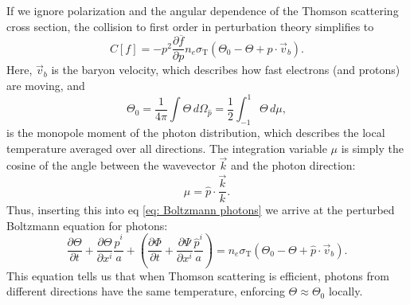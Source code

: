 \documentclass{aa}
\numberwithin{equation}{section}
\numberwithin{table}{section}
\numberwithin{figure}{section}
\begin{document}
If we ignore polarization and the angular dependence of the Thomson scattering cross section, the collision to first order in perturbation theory simplifies to
\begin{equation}
  C[f] = -p^2\frac{\partial\overline{f}}{\partial p}n_e\sigma_\text{T}\left(\Theta_0 - \Theta + \hat{p}\cdot\vec{v}_b \right). \label{eq: collision photons}
\end{equation}
Here, $\vec{v}_b$ is the baryon velocity, which describes how fast electrons (and protons) are moving, and
\begin{equation}
  \Theta_0 = \frac{1}{4\pi}\int\Theta\,d\Omega_{\hat{p}} = \frac{1}{2}\int_{-1}^{1}\Theta\,d\mu, 
\end{equation}
is the monopole moment of the photon distribution, which describes the local temperature averaged over all directions. The integration variable $\mu$ is simply the cosine of the angle between the wavevector $\vec{k}$ and the photon direction:
\begin{equation}
  \mu = \hat{p}\cdot\frac{\vec{k}}{k}.
\end{equation}
Thus, inserting this into eq \eqref{eq: Boltzmann photons} we arrive at the perturbed Boltzmann equation for photons:
\begin{equation}
  \frac{\partial{\Theta}}{\partial t} + \frac{\partial{\Theta}}{\partial x^{i}}\frac{\hat{p}^{i}}{a} + \left(\frac{\partial{\Phi}}{\partial t} + \frac{\partial{\Psi}}{\partial x^{i}}\frac{\hat{p}^{i}}{a} \right) = n_e\sigma_\text{T}\left(\Theta_0 - \Theta + \hat{p}\cdot\vec{v}_b \right).
\end{equation}
This equation tells us that when Thomson scattering is efficient, photons from different directions have the same temperature, enforcing $\Theta\approx\Theta_0$ locally.
\end{document}

